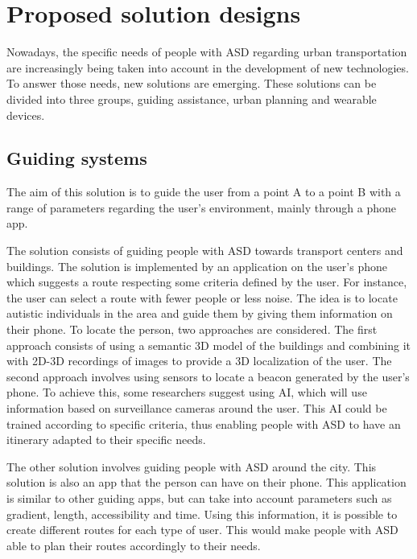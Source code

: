 \section{Proposed solution designs}

Nowadays, the specific needs of people with ASD regarding urban transportation are increasingly being taken into account in the development of new technologies. To answer those needs, new solutions are emerging. These solutions can be divided into three groups, guiding assistance, urban planning and wearable devices.

\subsection{Guiding systems}

The aim of this solution is to guide the user from a point A to a point B with a range of parameters regarding the user's environment, mainly through a phone app\cite{2017BuildingSmartAccessible}\cite{2023AccessibilityStrategiesPromote}. 

The solution consists of guiding people with ASD towards transport centers and buildings\cite{2017BuildingSmartAccessible}. The solution is implemented by an application on the user's phone which suggests a route respecting some criteria defined by the user. For instance, the user can select a route with fewer people or less noise. The idea is to locate autistic individuals in the area and guide them by giving them information on their phone. To locate the person, two approaches are considered. The first approach consists of using a semantic 3D model of the buildings and combining it with 2D-3D recordings of images to provide a 3D localization of the user. The second approach involves using sensors to locate a beacon generated by the user's phone. To achieve this, some researchers suggest using AI, which will use information based on surveillance cameras around the user\cite{2017BuildingSmartAccessible}. This AI could be trained according to specific criteria, thus enabling people with ASD to have an itinerary adapted to their specific needs.

The other solution involves guiding people with ASD around the city\cite{2023AccessibilityStrategiesPromote}. This solution is also an app that the person can have on their phone. This application is similar to other guiding apps, but can take into account parameters such as gradient, length, accessibility and time. Using this information, it is possible to create different routes for each type of user. This would make people with ASD able to plan their routes accordingly to their needs.


